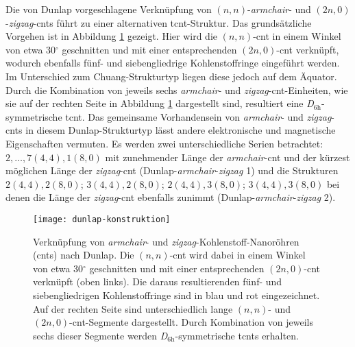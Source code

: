 Die von Dunlap vorgeschlagene Verknüpfung von $(n,n)$-\textit{armchair}- und $(2n,0)$-\textit{zigzag}-\acp{cnt} führt zu einer alternativen \ac{tcnt}-Struktur. Das grundsätzliche Vorgehen ist in Abbildung \ref{abb:dunlap-konstruktion} gezeigt. Hier wird die $(n,n)$-\ac{cnt} in einem Winkel von etwa 30$^\circ$ geschnitten und mit einer entsprechenden $(2n,0)$-\ac{cnt} verknüpft, wodurch ebenfalls fünf- und siebengliedrige Kohlenstoffringe eingeführt werden. Im Unterschied zum \glqq Chuang-Strukturtyp\grqq{} liegen diese jedoch auf dem Äquator. Durch die Kombination von jeweils sechs \textit{armchair}- und \textit{zigzag}-\ac{cnt}-Einheiten, wie sie auf der rechten Seite in Abbildung \ref{abb:dunlap-konstruktion} dargestellt sind, resultiert eine \textit{D}$_{6\text{h}}$-symmetrische \ac{tcnt}. Das gemeinsame Vorhandensein von \textit{armchair}- und \textit{zigzag}-\acp{cnt} in diesem \glqq Dunlap-Strukturtyp\grqq{} lässt andere elektronische und magnetische Eigenschaften vermuten. Es werden zwei unterschiedliche Serien betrachtet: $2,\dots,7(4,4),1(8,0)$ mit zunehmender Länge der \textit{armchair}-\ac{cnt} und der kürzest möglichen Länge der \textit{zigzag}-\ac{cnt} (\glqq Dunlap-\textit{armchair}-\textit{zigzag} 1\grqq{}) und die Strukturen $2(4,4),2(8,0)$; $3(4,4),2(8,0)$; $2(4,4),3(8,0)$; $3(4,4),3(8,0)$ bei denen die Länge der \textit{zigzag}-\ac{cnt} ebenfalls zunimmt (\glqq Dunlap-\textit{armchair}-\textit{zigzag} 2\grqq{}).
\begin{figure}[ht!]
	\centering
	\texttt{[image: dunlap-konstruktion]}
	\captionsetup{figurewithin = chapter}
	\captionsetup{font=small, labelfont=bf}\caption[Verknüpfung von $(n,n)$-\textit{armchair}- und $(2n,0)$-\textit{zigzag}-\acp{cnt}]{Verknüpfung von \textit{armchair}- und \textit{zigzag}-Kohlenstoff-Nanoröhren (\acp{cnt}) nach Dunlap\supercite{dunlap1992connecting}. Die $(n,n)$-\ac{cnt} wird dabei in einem Winkel von etwa 30$^\circ$ geschnitten und mit einer entsprechenden $(2n,0)$-\ac{cnt} verknüpft (oben links). Die daraus resultierenden fünf- und siebengliedrigen Kohlenstoffringe sind in blau und rot eingezeichnet. Auf der rechten Seite sind unterschiedlich lange $(n,n)$- und $(2n,0)$-\ac{cnt}-Segmente dargestellt. Durch Kombination von jeweils sechs dieser Segmente werden \textit{D}$_{6\text{h}}$-symmetrische \acp{tcnt} erhalten.}
\label{abb:dunlap-konstruktion}
\end{figure}
\FloatBarrier

